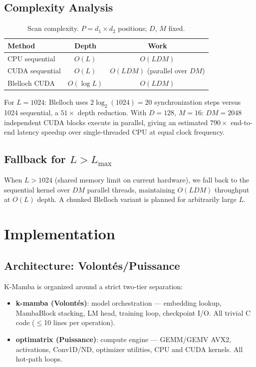 \documentclass[10pt,twocolumn]{article}
\begin{document}
\subsection{Complexity Analysis}

\begin{table}[h]
\centering
\caption{Scan complexity. $P = d_1 \times d_2$ positions; $D$, $M$ fixed.}
\label{tab:complexity}
\begin{tabular}{lcc}
\toprule
Method & Depth & Work \\
\midrule
CPU sequential & $O(L)$ & $O(LDM)$ \\
CUDA sequential & $O(L)$ & $O(LDM)$ (parallel over $DM$) \\
Blelloch CUDA & $O(\log L)$ & $O(LDM)$ \\
\bottomrule
\end{tabular}
\end{table}

For $L = 1024$: Blelloch uses $2\log_2(1024) = 20$ synchronization steps
versus 1024 sequential, a $51\times$ depth reduction.
With $D = 128$, $M = 16$: $DM = 2048$ independent CUDA blocks execute in
parallel, giving an estimated $790\times$ end-to-end latency speedup over
single-threaded CPU at equal clock frequency.

\subsection{Fallback for $L > L_{\max}$}

When $L > 1024$ (shared memory limit on current hardware), we fall back
to the sequential kernel over $DM$ parallel threads, maintaining
$O(LDM)$ throughput at $O(L)$ depth. A chunked Blelloch variant
is planned for arbitrarily large $L$.

\section{Implementation}
\label{sec:implementation}

\subsection{Architecture: Volontés/Puissance}

K-Mamba is organized around a strict two-tier separation:

\begin{itemize}
  \item \textbf{k-mamba (Volontés)}: model orchestration —
        embedding lookup, MambaBlock stacking, LM head,
        training loop, checkpoint I/O. All trivial C code ($\leq$10 lines per operation).
  \item \textbf{optimatrix (Puissance)}: compute engine —
        GEMM/GEMV AVX2, activations, Conv1D/ND, optimizer utilities,
        CPU and CUDA kernels. All hot-path loops.
\end{itemize}
\end{document}
